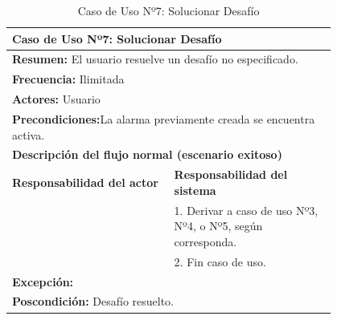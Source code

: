\begin{table}[H]
    \centering
    \caption{Caso de Uso Nº7: Solucionar Desafío}
    \vspace{10pt}
    
    \begin{tabular}{| p{0.4\linewidth} | p{0.4\linewidth} |}
        \hline
        \multicolumn{2}{|l|}{\textbf{Caso de Uso Nº7:} Solucionar Desafío} \\
        \hline
        \multicolumn{2}{|l|}{\textbf{Resumen:} El usuario resuelve un desafío no especificado.} \\
        \hline
        \multicolumn{2}{|l|}{\textbf{Frecuencia:}  Ilimitada} \\
        \hline
        \multicolumn{2}{|l|}{\textbf{Actores:}  Usuario} \\
        \hline
        \multicolumn{2}{|l|}{\textbf{Precondiciones:}La alarma previamente creada se encuentra activa.} \\
        \hline
        \multicolumn{2}{|l|}{\textbf{Descripción del flujo normal (escenario exitoso)} } \\
        \hline
        \textbf{Responsabilidad del actor} & \textbf{Responsabilidad del sistema}\\
            & 1. Derivar a caso de uso Nº3, Nº4, o Nº5, según corresponda.\\
            & 2. Fin caso de uso. \\
        \hline
        \multicolumn{2}{|p{0.8\linewidth}|}{
            \textbf{Excepción:}}\\
        \hline
        \multicolumn{2}{|l|}{\textbf{Poscondición:}  Desafío resuelto.} \\
        \hline
    \end{tabular}

    \label{table:7}
\end{table}

